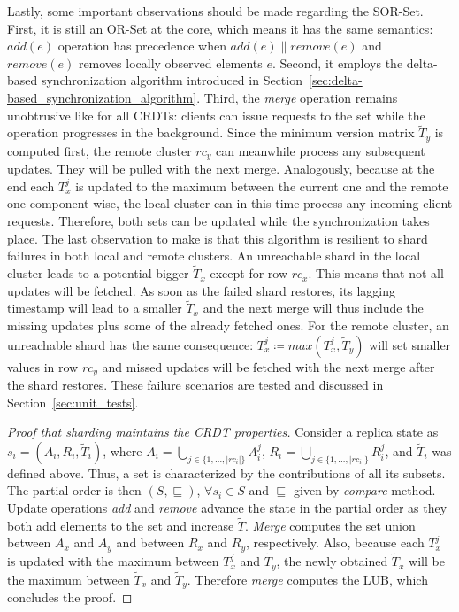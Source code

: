 Lastly, some important observations should be made regarding the SOR-Set. First,
it is still an OR-Set at the core, which means it has the same semantics:
$\textit{add}(e)$ operation has precedence when $\textit{add}(e) \parallel
\textit{remove}(e)$ and $\textit{remove}(e)$ removes locally observed elements
$e$. Second, it employs the delta-based synchronization algorithm introduced in
Section~\ref{sec:delta-based_synchronization_algorithm}. Third, the
\textit{merge} operation remains unobtrusive like for all CRDTs: clients can
issue requests to the set while the operation progresses in the background.
Since the minimum version matrix $\tilde{T}_{y}$ is computed first, the remote
cluster $rc_{y}$ can meanwhile process any subsequent updates. They will be
pulled with the next merge. Analogously, because at the end each $T_{x}^{j}$ is
updated to the maximum between the current one and the remote one
component-wise, the local cluster can in this time process any incoming client
requests. Therefore, both sets can be updated while the synchronization takes
place. The last observation to make is that this algorithm is resilient to shard
failures in both local and remote clusters. An unreachable shard in the local
cluster leads to a potential bigger $\tilde{T}_{x}$ except for row $rc_{x}$.
This means that not all updates will be fetched. As soon as the failed shard
restores, its lagging timestamp will lead to a smaller $\tilde{T}_{x}$ and the
next merge will thus include the missing updates plus some of the already
fetched ones. For the remote cluster, an unreachable shard has the same
consequence: $T_{x}^{j} \coloneqq max(T_{x}^{j}, \tilde{T}_{y})$ will set
smaller values in row $rc_{y}$ and missed updates will be fetched with the next
merge after the shard restores. These failure scenarios are tested and discussed
in Section~\ref{sec:unit_tests}.

\begin{proof}[Proof that sharding maintains the CRDT properties]
Consider a replica state as $s_{i} = (A_{i}, R_{i}, \tilde{T}_{i})$, where
$A_{i} = \bigcup_{j \in \{1,\ldots,|rc_{i}|\}} A_{i}^{j}$, $R_{i} = \bigcup_{j
\in \{1,\ldots,|rc_{i}|\}} R_{i}^{j}$, and $\tilde{T}_{i}$ was defined above.
Thus, a set is characterized by the contributions of all its subsets. The
partial order is then $(S, \sqsubseteq)$, $\forall s_{i} \in S$ and
$\sqsubseteq$ given by \textit{compare} method. Update operations \textit{add}
and \textit{remove} advance the state in the partial order as they both add
elements to the set and increase $\tilde{T}$. \textit{Merge} computes the set
union between $A_{x}$ and $A_{y}$ and between $R_{x}$ and $R_{y}$, respectively.
Also, because each $T_{x}^{j}$ is updated with the maximum between $T_{x}^{j}$
and $\tilde{T}_{y}$, the newly obtained $\tilde{T}_{x}$ will be the maximum
between $\tilde{T}_{x}$ and $\tilde{T}_{y}$. Therefore \textit{merge} computes
the LUB, which concludes the proof.
\end{proof}

